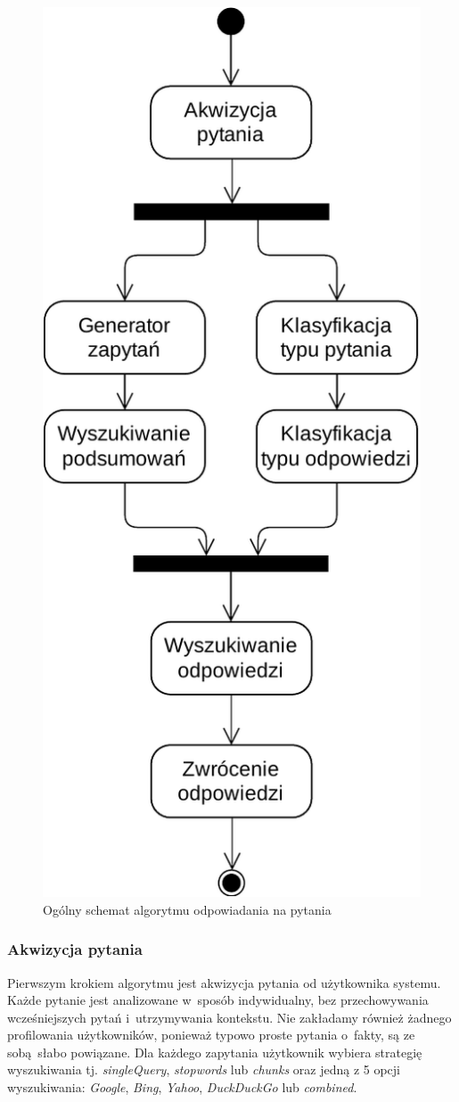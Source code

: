\begin{figure}[h]
    \centering
    \includegraphics[width=0.7\columnwidth]{figures/WEDT-Algorytm.pdf}
    \caption{Ogólny schemat algorytmu odpowiadania na pytania}
    \label{fig:algorithm-overview}
\end{figure}

\subsubsection{Akwizycja pytania}
Pierwszym krokiem algorytmu jest akwizycja pytania od użytkownika systemu. Każde pytanie jest analizowane w~sposób indywidualny, bez przechowywania wcześniejszych pytań i~utrzymywania kontekstu. Nie zakładamy również żadnego profilowania użytkowników, ponieważ typowo proste pytania o~fakty, są ze sobą słabo powiązane. Dla każdego zapytania użytkownik wybiera strategię wyszukiwania tj. \emph{singleQuery}, \emph{stopwords} lub \emph{chunks} oraz jedną z 5 opcji wyszukiwania: \emph{Google}, \emph{Bing}, \emph{Yahoo}, \emph{DuckDuckGo} lub \emph{combined}.

